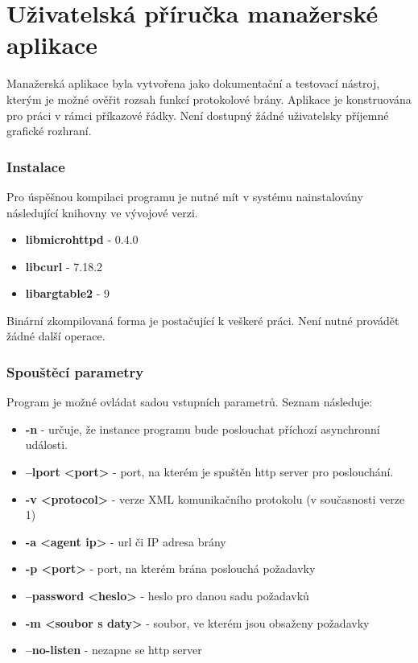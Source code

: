 \chapter{Uživatelská příručka manažerské aplikace}
\label{kap_uzivatelska_prirucka_manazer}
Manažerská aplikace byla vytvořena jako dokumentační a testovací nástroj, kterým je možné
ověřit rozsah funkcí protokolové brány. Aplikace je konstruována pro práci v rámci
příkazové řádky. Není dostupný žádné uživatelsky příjemné grafické rozhraní.

\subsection*{Instalace}
Pro úspěšnou kompilaci programu je nutné mít v systému nainstalovány následující knihovny ve vývojové verzi.
\begin{itemize}
	\item \textbf{libmicrohttpd} - 0.4.0
	\item \textbf{libcurl} - 7.18.2
	\item \textbf{libargtable2} - 9
\end{itemize}

Binární zkompilovaná forma je postačující k veškeré práci. Není nutné provádět žádné další operace.

\subsection*{Spouštěcí parametry}
Program je možné ovládat sadou vstupních parametrů. Seznam následuje:
\begin{itemize}
	\item \textbf{-n} - určuje, že instance programu bude poslouchat příchozí asynchronní události.
	\item \textbf{--lport <port>} - port, na kterém je spuštěn http server pro poslouchání.
	\item \textbf{-v <protocol>} - verze XML komunikačního protokolu (v současnosti verze 1)
	\item \textbf{-a <agent ip>} - url či IP adresa brány
	\item \textbf{-p <port>} - port, na kterém brána poslouchá požadavky
	\item \textbf{--password <heslo>} - heslo pro danou sadu požadavků
	\item \textbf{-m <soubor s daty>} - soubor, ve kterém jsou obsaženy požadavky
	\item \textbf{--no-listen} - nezapne se http server
\end{itemize}

